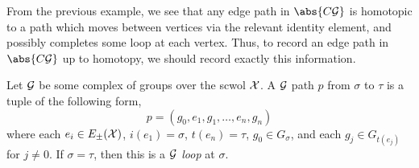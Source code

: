 From the previous example, we see that any edge path in $\abs{C\calg}$ is homotopic to a path which moves between vertices via the relevant identity element, and possibly completes some loop at each vertex.
Thus, to record an edge path in $\abs{C\calg}$ up to homotopy, we should record exactly this information.

\begin{definition}
	Let $\mathcal{G}$ be some complex of groups over the scwol $\mathcal{X}$.
	A $\mathcal{G}$ path $p$ from $\sigma$ to  $\tau$ is a tuple of the following form,
	\[
		p = (g_0, e_1, g_1, \ldots ,e_n, g_n)
	\]
	where each $e_i \in E_\pm(\mathcal{X})$, $i(e_1) = \sigma$, $t(e_n)=\tau$, $g_0 \in G_\sigma$, and each $g_j \in G_{t(e_j)}$ for  $j \neq 0$.
	If $\sigma=\tau$, then this is a \emph{ $\mathcal{G}$ loop} at  $\sigma$.
	\label{def:paths_in_complexes_of_groups}
\end{definition}

